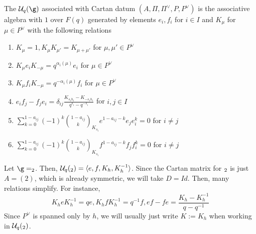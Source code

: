\documentclass[11pt,leqno,oneside]{amsart}
\numberwithin{thm}{section}
\newcommand{\weightlattice}{P}
\renewcommand{\simpleroots}{\Pi}
\newcommand{\U}{\mathcal{U}}
\newcommand{\qbinom}[3][q]{\binom{#2}{#3}_{#1}}
\begin{document}
\begin{defn}
  The  \(\U_q(\g)\) associated with Cartan datum
  \((A, \simpleroots, \simpleroots^\vee, \weightlattice,
  \weightlattice^\vee)\) is the associative algebra with \(1\) over
  \(F(q)\) generated by elements \(e_i, f_i\) for \(i \in I\) and
  \(K_\mu\) for \(\mu \in \weightlattice^\vee\) with the following
  relations
  \begin{enumerate}
  \item \(K_\mu = 1, K_{\mu} K_{\mu'} = K_{\mu+\mu'}\) for \(\mu,\mu' \in
    \weightlattice^\vee\)
  \item \(K_\mu e_i K_{-\mu} = q^{\alpha_i(\mu)}e_i\) for \(\mu \in
    \weightlattice^\vee\) 
  \item \(K_\mu f_i K_{-\mu} = q^{-\alpha_i(\mu)}f_i\) for \(\mu \in
    \weightlattice^\vee\)
  \item \(e_i f_j - f_j e_i = \delta_{ij} \frac{K_{s_i h_i} - K_{-s_i
        h_i}}{q^{s_i} - q^{-s_i}}\) for \(i,j \in I\)
  \item \(\sum_{k=0}^{1-a_{ij}} (-1)^k \qbinom[K_{s_i}]{1-a_{ij}}{k}
    e^{1-a_{ij}-k}e_j e_i^k = 0\) for \(i \neq j\)
  \item \(\sum_{k=0}^{1-a_{ij}} (-1)^k \qbinom[K_{s_i}]{1-a_{ij}}{k}
    f^{1-a_{ij}-k}f_j f_i^k = 0\) for \(i \neq j\)
  \end{enumerate}
\end{defn}
\begin{example}
  Let \(\g = \sl_2\). Then, \(\U_q(\sl_2) = \langle e,f,K_h,K_h^{-1}
  \rangle\). Since the Cartan matrix for \(\sl_2\) is just \(A =
  (2)\), which is already symmetric, we will take \(D = Id\). Then, many relations simplify. For instance, \[
    K_h e K_h^{-1} = q e, K_h f K_h^{-1}= q^{-1} f, ef-fe = \frac{K_{h}-K_{h}^{-1}}{q-q^{-1}}
  \]
  Since \(\weightlattice^\vee\) is spanned only by \(h\), we will
  usually just write \(K := K_h\) when working in \(\U_q(\sl_2)\).
\end{example}
\end{document}
